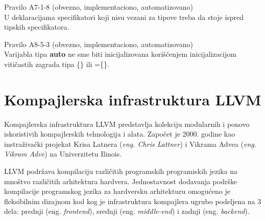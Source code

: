 \documentclass[12pt,oneside]{memoir}
\begin{document}
\begin{center}
\begin{tcolorbox}
Pravilo A7-1-8 (obvezno, implementaciono, automatizovano) \\
U deklaracijama specifikatori koji nisu vezani za tipove treba da stoje
ispred tipskih specifikatora.
\end{tcolorbox}
\end{center}

\begin{center}
\begin{tcolorbox}
Pravilo A8-5-3 (obvezno, implementaciono, automatizovano) \\
Varijabla tipa \textbf{auto} ne sme biti inicijalizovana kori\v{s}\'{c}enjem
inicijalizacijom viti\v{c}astih zagrada tipa \{\} ili =\{\}.
\end{tcolorbox}
\end{center}



\chapter{Kompajlerska infrastruktura LLVM}
\label{chp:llvm}

Kompajlerska infrastruktura LLVM predstavlja kolekciju modularnih i ponovo iskoristivih kompajlerskih tehnologija i alata.
Započet je 2000. godine kao instraživački projekat Krisa Latnera (\textit{eng. Chris Lattner}) i Vikrama Advea (\textit{eng. Vikram Adve}) na Univerzitetu Ilinois.

LLVM podržava kompilaciju različitih programskih programiskih jezika na mnoštvo različitih arhitektura hardvera. Jednostavnost dodavanja podrške kompilacije programskog jezika za hardversku arhitekturu omogućeno je fleksibilnim dizajnom kod kog je infrastruktura kompajlera ugrubo podeljena na 3 dela: prednji (eng. \textit{frontend}), srednji (eng. \textit{middle-end}) i zadnji (eng. \textit{backend}). 
\end{document}
